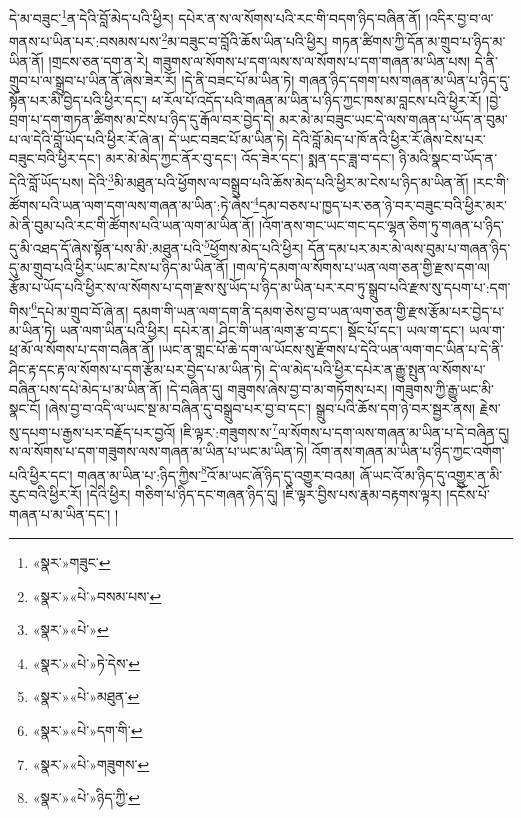 དེ་མ་བཟུང་\footnote{«སྣར་»གཟུང་}ན་དེའི་བློ་མེད་པའི་ཕྱིར། དཔེར་ན་ས་ལ་སོགས་པའི་རང་གི་བདག་ཉིད་བཞིན་ནོ། །འདིར་བྱ་བ་ལ་གནས་པ་ཡིན་པར་:བསམས་པས་\footnote{«སྣར་»«པེ་»བསམ་པས་}མ་བཟུང་བ་བློའི་ཆོས་ཡིན་པའི་ཕྱིར། གཏན་ཚིགས་ཀྱི་དོན་མ་གྲུབ་པ་ཉིད་མ་ཡིན་ནོ། །གྲངས་ཅན་དག་ན་རེ། གཟུགས་ལ་སོགས་པ་དག་ལས་ས་ལ་སོགས་པ་དག་གཞན་མ་ཡིན་པས། དེ་ནི་གྲུབ་པ་ལ་སྒྲུབ་པ་ཡིན་ནོ་ཞེས་ཟེར་རོ། །དེ་ནི་བཟང་པོ་མ་ཡིན་ཏེ། གཞན་ཉིད་དགག་པས་གཞན་མ་ཡིན་པ་ཉིད་དུ་སྟོན་པར་མི་བྱེད་པའི་ཕྱིར་དང་། ཕ་རོལ་པོ་འདོད་པའི་གཞན་མ་ཡིན་པ་ཉིད་ཀྱང་ཁས་མ་བླངས་པའི་ཕྱིར་རོ། །བྱེ་བྲག་པ་དག་གཏན་ཚིགས་མ་ངེས་པ་ཉིད་དུ་རྒོལ་བར་བྱེད་དེ། མར་མེ་མ་བཟུང་ཡང་དེ་ལས་གཞན་པ་ཡོད་ན་བུམ་པ་ལ་དེའི་བློ་ཡོད་པའི་ཕྱིར་རོ་ཞེ་ན། དེ་ཡང་བཟང་པོ་མ་ཡིན་ཏེ། དེའི་བློ་མེད་པ་ཁོ་ནའི་ཕྱིར་རོ་ཞེས་ངེས་པར་བཟུང་བའི་ཕྱིར་དང་། མར་མེ་མེད་ཀྱང་ནོར་བུ་དང་། འོད་ཟེར་དང་། སྨན་དང་ཟླ་བ་དང་། ཉི་མའི་སྣང་བ་ཡོད་ན་དེའི་བློ་ཡོད་པས། དེའི་\footnote{«སྣར་»«པེ་»}མི་མཐུན་པའི་ཕྱོགས་ལ་བསྒྲུབ་པའི་ཆོས་མེད་པའི་ཕྱིར་མ་ངེས་པ་ཉིད་མ་ཡིན་ནོ། །རང་གི་ཚོགས་པའི་ཡན་ལག་དག་ལས་གཞན་མ་ཡིན་:ཏེ་ཞེས་\footnote{«སྣར་»«པེ་»ཏེ་དེས་}དམ་བཅས་པ་ཁྱད་པར་ཅན་ཉེ་བར་བཟུང་བའི་ཕྱིར་མར་མེ་ནི་བུམ་པའི་རང་གི་ཚོགས་པའི་ཡན་ལག་མ་ཡིན་ནོ། །འོག་ནས་གང་ཡང་གང་དང་ལྷན་ཅིག་ཏུ་གཞན་པ་ཉིད་དུ་མི་འཐད་དོ་ཞེས་སྟོན་པས་མི་:མཐུན་པའི་\footnote{«སྣར་»«པེ་»མཐུན་}ཕྱོགས་མེད་པའི་ཕྱིར། དོན་དམ་པར་མར་མེ་ལས་བུམ་པ་གཞན་ཉིད་དུ་མ་གྲུབ་པའི་ཕྱིར་ཡང་མ་ངེས་པ་ཉིད་མ་ཡིན་ནོ། །གལ་ཏེ་དམག་ལ་སོགས་པ་ཡན་ལག་ཅན་གྱི་རྫས་དག་ལ། རྩོམ་པ་ཡོད་པའི་ཕྱིར་ས་ལ་སོགས་པ་དག་རྫས་སུ་ཡོད་པ་ཉིད་མ་ཡིན་པར་རབ་ཏུ་སྒྲུབ་པའི་རྫས་སུ་དཔག་པ་:དག་གིས་\footnote{«སྣར་»«པེ་»དག་གི་}དཔེ་མ་གྲུབ་བོ་ཞེ་ན། དམག་གི་ཡན་ལག་དག་ནི་དམག་ཅེས་བྱ་བ་ཡན་ལག་ཅན་གྱི་རྫས་རྩོམ་པར་བྱེད་པ་མ་ཡིན་ཏེ། ཡན་ལག་ཡིན་པའི་ཕྱིར། དཔེར་ན། ཤིང་གི་ཡན་ལག་རྩ་བ་དང་། སྡོང་པོ་དང་། ཡལ་ག་དང་། ཡལ་ག་ཕྲ་མོ་ལ་སོགས་པ་དག་བཞིན་ནོ། །ཡང་ན་གླང་པོ་ཆེ་དག་ལ་ཡོངས་སུ་རྫོགས་པ་དེའི་ཡན་ལག་གང་ཡིན་པ་དེ་ནི་ཤིང་རྟ་དང་རྟ་ལ་སོགས་པ་དག་རྩོམ་པར་བྱེད་པ་མ་ཡིན་ཏེ། དེ་ལ་མེད་པའི་ཕྱིར་དཔེར་ན་རྒྱུ་སྤུན་ལ་སོགས་པ་བཞིན་པས་དཔེ་མེད་པ་མ་ཡིན་ནོ། །དེ་བཞིན་དུ། གཟུགས་ཞེས་བྱ་བ་མ་གཏོགས་པར། །གཟུགས་ཀྱི་རྒྱུ་ཡང་མི་སྣང་ངོ། །ཞེས་བྱ་བ་འདི་ལ་ཡང་སྔ་མ་བཞིན་དུ་བསྒྲུབ་པར་བྱ་བ་དང་། སྒྲུབ་པའི་ཆོས་དག་ཉེ་བར་སྦྱར་ནས། རྗེས་སུ་དཔག་པ་རྒྱས་པར་བརྗོད་པར་བྱའོ། །ཇི་ལྟར་:གཟུགས་ས་\footnote{«སྣར་»«པེ་»གཟུགས་}ལ་སོགས་པ་དག་ལས་གཞན་མ་ཡིན་པ་དེ་བཞིན་དུ། ས་ལ་སོགས་པ་དག་གཟུགས་ལས་གཞན་མ་ཡིན་པ་ཡང་མ་ཡིན་ཏེ། འོག་ནས་གཞན་མ་ཡིན་པ་ཉིད་ཀྱང་འགོག་པའི་ཕྱིར་དང་། གཞན་མ་ཡིན་པ་:ཉིད་ཀྱིས་\footnote{«སྣར་»«པེ་»ཉིད་ཀྱི་}འོ་མ་ཡང་ཞོ་ཉིད་དུ་འགྱུར་བའམ། ཞོ་ཡང་འོ་མ་ཉིད་དུ་འགྱུར་ན་མི་རུང་བའི་ཕྱིར་རོ། །དེའི་ཕྱིར། གཅིག་པ་ཉིད་དང་གཞན་ཉིད་དུ། །ཇི་ལྟར་བྱིས་པས་རྣམ་བརྟགས་ལྟར། །དངོས་པོ་གཞན་པ་མ་ཡིན་དང་། །
